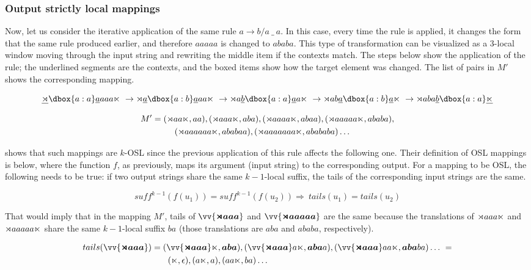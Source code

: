 \subsubsection{Output strictly local mappings}

Now, let us consider the iterative application of the same rule $a \rightarrow b / a~ \_~ a$.
In this case, every time the rule is applied, it changes the form that the same rule produced earlier, and therefore $aaaaa$ is changed to $ababa$.
This type of transformation can be visualized as a $3$-local window moving through the input string and rewriting the middle item if the contexts match.
The steps below show the application of the rule; the underlined segments are the contexts, and the boxed items show how the target element was changed.
The list of pairs in $M'$ shows the corresponding mapping.

$$
\underline{\bow}\dbox{a:a}\underline{a}aaa\eow~ \rightarrow
\bow\underline{a}\dbox{a:b}\underline{a}aa\eow~ \rightarrow
\bow a\underline{b}\dbox{a:a}\underline{a}a\eow~ \rightarrow
\bow ab\underline{a}\dbox{a:b}\underline{a}\eow~ \rightarrow
\bow aba\underline{b}\dbox{a:a}\underline{\eow}
$$

\begin{multline*}
M' = (\bow aa\eow, aa), (\bow aaa\eow, aba), (\bow aaaa\eow, abaa), (\bow aaaaa\eow, ababa), \\
 \qquad\quad \shoveleft{(\bow aaaaaa\eow, ababaa), (\bow aaaaaaa\eow, abababa)\dots}
\end{multline*}

\cite{ChandleeEtAl2015} shows that such mappings are $k$-OSL since the previous application of this rule affects the following one.
Their definition of OSL mappings is below, where the function $f$, as previously, maps its argument (input string) to the corresponding output.
For a mapping to be OSL, the following needs to be true: if two output strings share the same $k-1$-local suffix, the tails of the corresponding input strings are the same.


\[
	suff^{k-1}(f(u_1)) = suff^{k-1}(f(u_2)) \Rightarrow~ tails(u_1) = tails(u_2)
\]

That would imply that in the mapping $M'$, tails of $\vv{\bm{\bow aaa}}$ and $\vv{\bm{\bow aaaaa}}$ are the same because the translations of $\rtimes aaa\ltimes$ and $\rtimes aaaaa\ltimes$ share the same $k-1$-local suffix $ba$ (those translations are $aba$ and $ababa$, respectively).

\begin{multline*}
tails(\vv{\bm{\bow aaa}}) = (\vv{\bm{\bow aaa}}\eow, \bm{aba}), (\vv{\bm{\bow aaa}}a\eow, \bm{aba}a), (\vv{\bm{\bow aaa}}aa\eow, \bm{aba}ba) \dots~ =  \\
 \qquad\qquad\qquad\qquad\quad \shoveleft{(\eow, \epsilon), (a\eow, a), (aa\eow, ba) \dots}
\end{multline*}

